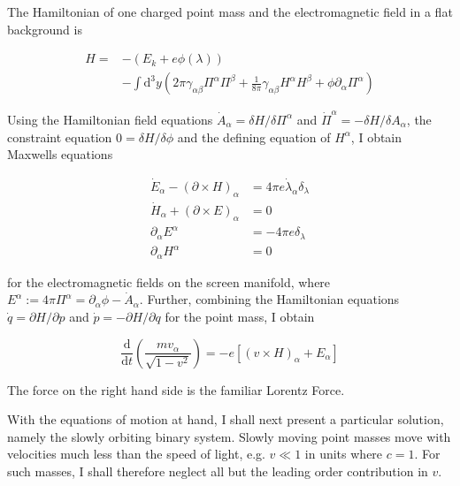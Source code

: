\documentclass[11pt]{article}
\begin{document}
The Hamiltonian of one charged point mass and the electromagnetic field in a flat background is

\begin{equation}
\begin{split}
		H = &- \left(E_k + e \phi \left( \lambda \right) \right)\\
		&- \int \mathrm{d}^3 y \left( 2 \pi \gamma_{\alpha \beta} \Pi^\alpha \Pi^\beta + \frac{1}{8 \pi}\gamma_{\alpha \beta} H^\alpha H^\beta
		+ \phi \partial_\alpha \Pi^\alpha \right)
\end{split}
\end{equation}

Using the Hamiltonian field equations $\dot{A}_\alpha = \delta H / \delta \Pi^\alpha$ and $\dot{\Pi}^\alpha = -\delta H / \delta A_\alpha$,  the constraint equation $0 = \delta H / \delta \phi$ and the defining equation of $H^\alpha$,  I obtain Maxwells equations

\begin{align}
	\dot{E}_\alpha - \left(\partial \times H \right)_\alpha &= 4 \pi e 
	\dot{\lambda}_\alpha \delta_\lambda\\
		\dot{H}_\alpha +  \left( \partial \times E \right)_\alpha &= 0\\
	\partial_\alpha E^\alpha &= - 4 \pi e \delta_\lambda\\ 
	\partial_\alpha H^\alpha &= 0
\end{align}

for the electromagnetic fields on the screen manifold, where $E^\alpha := 4 \pi \Pi^\alpha = \partial_\alpha \phi - \dot{A}_\alpha $. Further, combining the Hamiltonian equations $\dot{q} = \partial H / \partial p$ and $\dot{p} = - \partial H / \partial q$ for the point mass, I obtain 

\begin{equation}
	\frac{\mathrm{d}}{\mathrm{d}t} 
	\left( \frac{m v_\alpha}{\sqrt{1 - v^2 }}\right)
	= -e \left[ \left(v \times H \right)_\alpha + E_\alpha \right] 
\end{equation} 

The force on the right hand side is the familiar Lorentz Force.

With the equations of motion at hand, I shall next present a particular solution, namely the slowly orbiting binary system. Slowly moving point masses move with velocities much less than the speed of light, e.g.  $ v \ll 1 $ in units where $c = 1$. For such masses, I shall therefore neglect all but the leading order contribution in $v$.
\end{document}
